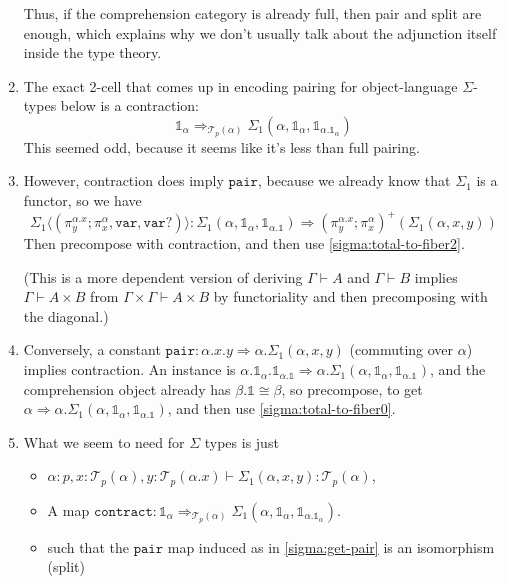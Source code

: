 \documentclass[10pt]{article}
\theoremstyle{definition}
\newcommand{\tcell}{\Rightarrow}
\newcommand\TrPlus[2]{\ensuremath{{#1}^+(#2)}}
\newcommand\El[2]{\mathcal{T}_{#1}(#2)}
\newcommand\ap[2]{\ensuremath{#1 \langle #2 \rangle }}
\newcommand\One{\ensuremath{\mathds{1}}}
\newcommand\mtt[1]{\mathtt{#1}}
\begin{document}
\begin{enumerate}
  Thus, if the comprehension category is already full, then pair and
  split are enough, which explains why we don't usually talk about the
  adjunction itself inside the type theory.  
  
\item The exact 2-cell that comes up in encoding pairing for
  object-language $\Sigma$-types below is a contraction:
  \[
  \One_\alpha \tcell_{\El{p}{\alpha}} \Sigma_1(\alpha,\One_\alpha,\One_{\alpha.{\One_\alpha}})
  \]
  This seemed odd, because it seems like it's less than full pairing.    

\item \label{sigma:get-pair} However, contraction does imply
  $\mtt{pair}$, because we already know that $\Sigma_1$ is a functor, so
  we have
  \[
  \ap{\Sigma_1}{(\pi^{\alpha.x}_y;\pi^\alpha_x, \mtt{var}, \mtt{var}?)} :
  \Sigma_1(\alpha,\One_\alpha,\One_{\alpha.\One}) \tcell \TrPlus{(\pi^{\alpha.x}_y;\pi^\alpha_x)}{\Sigma_1(\alpha,x,y)}
  \]
  Then precompose with contraction, and then use
  \ref{sigma:total-to-fiber2}.

  (This is a more dependent version of deriving $\Gamma \vdash A$ and
  $\Gamma \vdash B$ implies $\Gamma \vdash A \times B$ from $\Gamma
  \times \Gamma \vdash A \times B$ by functoriality and then
  precomposing with the diagonal.)
  
\item Conversely, a constant $\mtt{pair} : \alpha.x.y \tcell
  \alpha.\Sigma_1(\alpha,x,y)$ (commuting over $\alpha$) implies
  contraction. An instance is $\alpha.\One_{\alpha}.\One_{\alpha.\One} \tcell
  \alpha.\Sigma_1(\alpha,\One_\alpha,\One_{\alpha.\One})$, and the comprehension
  object already has $\beta.\One \cong \beta$, so precompose, to get
  $\alpha \tcell \alpha.\Sigma_1(\alpha,\One_\alpha,\One_{\alpha.\One})$, and
  then use \ref{sigma:total-to-fiber0}.

\item \label{sigma:spec} What we seem to need for $\Sigma$ types is just
  \begin{itemize}
  \item $\alpha : p, x : \El{p}{\alpha}, y : \El{p}{\alpha.x} \vdash \Sigma_1(\alpha,x,y) : \El{p}{\alpha}$,
  \item A map $\mtt{contract} : \One_\alpha \tcell_{\El{p}{\alpha}} \Sigma_1(\alpha,\One_\alpha,\One_{\alpha.{\One_\alpha}})$.
  \item such that the $\mtt{pair}$ map induced as in
    \ref{sigma:get-pair} is an isomorphism (split)
  \end{itemize}


\end{enumerate}
\end{document}
